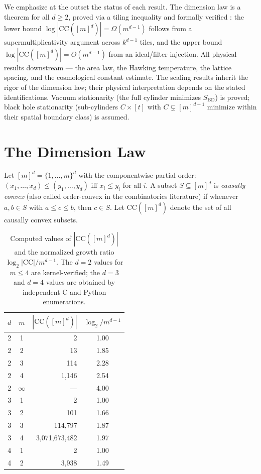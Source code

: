 \documentclass[aps,prl,twocolumn,superscriptaddress]{revtex4-2}
\begin{document}
We emphasize at the outset the status of each result. The dimension
law is a theorem for all $d \geq 2$, proved via a tiling inequality
and formally verified \cite{DiFiorePaper2}: the lower bound
$\log|\mathrm{CC}([m]^d)| = \Omega(m^{d-1})$ follows from a
supermultiplicativity argument across $k^{d-1}$ tiles, and the upper
bound $\log|\mathrm{CC}([m]^d)| = O(m^{d-1})$ from an ideal/filter
injection. All physical results downstream --- the area law, the
Hawking temperature, the lattice spacing, and the cosmological
constant estimate. The scaling results inherit the rigor of the
dimension law; their physical interpretation depends on the stated
identifications. Vacuum stationarity (the full cylinder minimizes
$S_{\mathrm{BD}}$) is proved; black hole stationarity
(sub-cylinders $C \times [t]$ with $C \subsetneq [m]^{d-1}$
minimize within their spatial boundary class) is assumed.

\section{The Dimension Law}

Let $[m]^d = \{1, \ldots, m\}^d$ with the componentwise partial order:
$(x_1, \ldots, x_d) \leq (y_1, \ldots, y_d)$ iff $x_i \leq y_i$ for
all $i$. A subset $S \subseteq [m]^d$ is \emph{causally convex} (also
called order-convex in the combinatorics literature) if whenever
$a, b \in S$ with $a \leq c \leq b$, then $c \in S$. Let
$\mathrm{CC}([m]^d)$ denote the set of all causally convex subsets.

\begin{table}[b]
\caption{Computed values of $|\mathrm{CC}([m]^d)|$ and the normalized
growth ratio $\log_2|\mathrm{CC}|/m^{d-1}$.  The $d=2$ values for
$m \leq 4$ are kernel-verified; the $d=3$ and $d=4$ values are
obtained by independent C and Python enumerations.}
\label{tab:dimension}
\begin{ruledtabular}
\begin{tabular}{ccrc}
$d$ & $m$ & $|\mathrm{CC}([m]^d)|$ & $\log_2/m^{d-1}$ \\
\midrule
2 & 1 & 2 & 1.00 \\
2 & 2 & 13 & 1.85 \\
2 & 3 & 114 & 2.28 \\
2 & 4 & 1{,}146 & 2.54 \\
2 & $\infty$ & --- & 4.00\footnotemark[1] \\
\midrule
3 & 1 & 2 & 1.00 \\
3 & 2 & 101 & 1.66 \\
3 & 3 & 114{,}797 & 1.87 \\
3 & 4 & 3{,}071{,}673{,}482 & 1.97 \\
\midrule
4 & 1 & 2 & 1.00 \\
4 & 2 & 3{,}938 & 1.49 \\
\end{tabular}
\end{ruledtabular}
\end{table}
\end{document}
